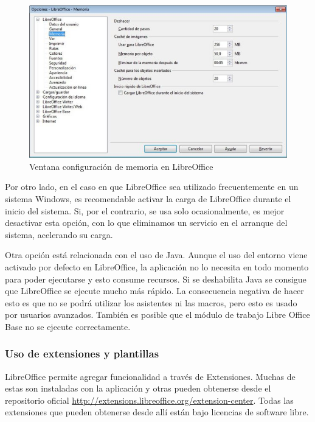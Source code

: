\documentclass[12pt]{article}
\begin{document}
\begin{figure}[H]
\centering
\includegraphics[width=1\textwidth]{configuracion_memoria_LO.png}
\renewcommand{\figurename}{Fig.}
\caption{Ventana configuración de memoria en LibreOffice}
\label{contexto:figura}
\end{figure}

Por otro lado, en el caso en que LibreOffice sea utilizado frecuentemente en un sistema Windows, es recomendable activar la carga de LibreOffice durante el inicio del sistema. Si, por el contrario, se usa solo ocasionalmente, es mejor desactivar esta opción, con lo que eliminamos un servicio en el arranque del sistema, acelerando su carga.

Otra opción está relacionada con el uso de Java. Aunque el uso del entorno viene activado por defecto en LibreOffice, la aplicación no lo necesita en todo momento para poder ejecutarse y esto consume recursos. Si se deshabilita Java se consigue que LibreOffice se ejecute mucho más rápido. La consecuencia negativa de hacer esto es que no se podrá utilizar los asistentes ni las macros, pero esto es usado por usuarios avanzados. También es posible que el módulo de trabajo Libre Office Base no se ejecute correctamente.

\subsubsection{Uso de extensiones y plantillas}

LibreOffice permite agregar funcionalidad a través de Extensiones. Muchas de estas son instaladas con la aplicación y otras pueden obtenerse desde el repositorio oficial \url {http://extensions.libreoffice.org/extension-center}. Todas las extensiones que pueden obtenerse desde allí están bajo  licencias de software libre.
\end{document}
